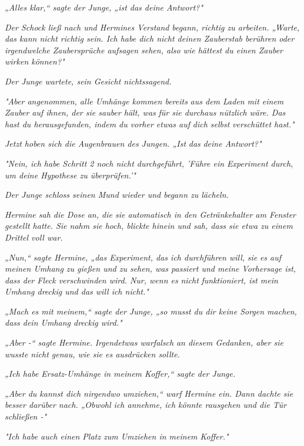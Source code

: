 {\emph{„Alles klar,“ sagte der Junge, „ist das deine Antwort?"}

\emph{Der Schock ließ nach und Hermines Verstand} \emph{begann, richtig zu arbeiten. „Warte, das kann nicht richtig sein. Ich habe dich nicht deinen Zauberstab berühren oder irgendwelche Zaubersprüche aufsagen sehen, also wie hättest du einen Zauber wirken können?"}

\emph{Der Junge wartete, sein Gesicht nichtssagend.}

\emph{"Aber angenommen, alle Umhänge kommen bereits} \emph{\emph{aus dem Laden}} \emph{mit einem Zauber auf ihnen, der sie sauber hält, was} \emph{für sie durchaus nützlich} \emph{wäre. Das hast du herausgefunden, indem du vorher etwas auf} \emph{\emph{dich selbst}} \emph{verschüttet hast."}

\emph{Jetzt hoben sich die Augenbrauen des Jungen. „Ist} \emph{\emph{das}} \emph{deine Antwort?"}

\emph{"Nein, ich habe Schritt 2 noch nicht durchgeführt, 'Führe ein Experiment durch, um deine Hypothese zu überprüfen.'"}

\emph{Der Junge schloss seinen Mund wieder und begann zu lächeln.}

\emph{Hermine sah die Dose an, die sie automatisch in den Getränkehalter am Fenster gestellt hatte. Sie nahm sie hoch, blickte hinein und sah, dass sie etwa zu einem Drittel voll war.}

\emph{„Nun,“ sagte Hermine, „das Experiment, das ich durchführen will,} \emph{sie} \emph{es auf meinen Umhang zu gießen und zu sehen, was passiert und meine Vorhersage ist, dass der Fleck verschwinden wird. Nur, wenn es} \emph{\emph{nicht}} \emph{funktioniert, ist mein Umhang dreckig und das will ich nicht."}

\emph{„Mach es mit meinem,“ sagte der Junge, „so musst du dir keine Sorgen machen, dass dein Umhang dreckig wird."}

\emph{„Aber -“ sagte Hermine.} \emph{Irgendetwas war\emph{falsch}} \emph{an diesem Gedanken, aber sie wusste nicht genau, wie sie es ausdrücken sollte.}

\emph{„Ich habe Ersatz-Umhänge in meinem Koffer,“ sagte der Junge.}

\emph{„Aber du kannst dich nirgendwo umziehen,“ warf Hermine ein. Dann dachte sie besser darüber nach. „Obwohl ich annehme, ich könnte rausgehen und die Tür schließen -"}

\emph{"Ich habe auch einen Platz zum Umziehen in meinem Koffer."}

}
